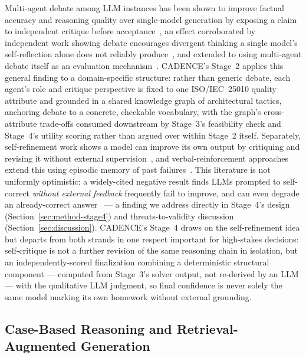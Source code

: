 \documentclass[preprint,12pt,authoryear]{elsarticle}
\renewcommand{\_}{\textunderscore\allowbreak{}}
\begin{document}
Multi-agent debate among LLM instances has been shown to improve factual accuracy and reasoning quality over single-model generation by exposing a claim to independent critique before acceptance~\citep{duetal2023debate}, an effect corroborated by independent work showing debate encourages divergent thinking a single model's self-reflection alone does not reliably produce~\citep{liang2024divergent}, and extended to using multi-agent debate itself as an evaluation mechanism~\citep{chan2024chateval}. CADENCE's Stage~2 applies this general finding to a domain-specific structure: rather than generic debate, each agent's role and critique perspective is fixed to one ISO/IEC~25010 quality attribute and grounded in a shared knowledge graph of architectural tactics, anchoring debate to a concrete, checkable vocabulary, with the graph's cross-attribute trade-offs consumed downstream by Stage~3's feasibility check and Stage~4's utility scoring rather than argued over within Stage~2 itself. Separately, self-refinement work shows a model can improve its own output by critiquing and revising it without external supervision~\citep{madaan2023selfrefine}, and verbal-reinforcement approaches extend this using episodic memory of past failures~\citep{shinn2023reflexion}. This literature is not uniformly optimistic: a widely-cited negative result finds LLMs prompted to self-correct \emph{without external feedback} frequently fail to improve, and can even degrade an already-correct answer~\citep{huang2024selfcorrect} --- a finding we address directly in Stage~4's design (Section~\ref{sec:method-stage4}) and threats-to-validity discussion (Section~\ref{sec:discussion}). CADENCE's Stage~4 draws on the self-refinement idea but departs from both strands in one respect important for high-stakes decisions: self-critique is not a further revision of the same reasoning chain in isolation, but an independently-scored finalization combining a deterministic structural component --- computed from Stage~3's solver output, not re-derived by an LLM --- with the qualitative LLM judgment, so final confidence is never solely the same model marking its own homework without external grounding.

\subsection{Case-Based Reasoning and Retrieval-Augmented Generation}
\end{document}
